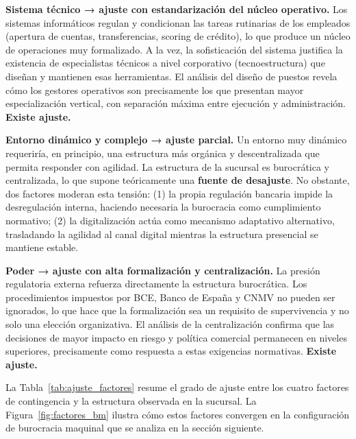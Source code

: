 \textbf{Sistema técnico → ajuste con estandarización del núcleo operativo.} Los sistemas
informáticos regulan y condicionan las tareas rutinarias de los empleados (apertura de
cuentas, transferencias, scoring de crédito), lo que produce un núcleo de operaciones muy
formalizado. A la vez, la sofisticación del sistema justifica la existencia de
especialistas técnicos a nivel corporativo (tecnoestructura) que diseñan y mantienen esas
herramientas. El análisis del diseño de puestos revela cómo los gestores operativos son
precisamente los que presentan mayor especialización vertical, con separación máxima entre
ejecución y administración. \textbf{Existe ajuste.}

\textbf{Entorno dinámico y complejo → ajuste parcial.} Un entorno muy dinámico requeriría,
en principio, una estructura más orgánica y descentralizada que permita responder con
agilidad. La estructura de la sucursal es burocrática y centralizada, lo que supone
teóricamente una \textbf{fuente de desajuste}. No obstante, dos factores moderan esta
tensión: (1) la propia regulación bancaria impide la desregulación interna, haciendo
necesaria la burocracia como cumplimiento normativo; (2) la digitalización actúa como
mecanismo adaptativo alternativo, trasladando la agilidad al canal digital mientras la
estructura presencial se mantiene estable.

\textbf{Poder → ajuste con alta formalización y centralización.} La presión regulatoria
externa refuerza directamente la estructura burocrática. Los procedimientos impuestos por
BCE, Banco de España y CNMV no pueden ser ignorados, lo que hace que la formalización sea
un requisito de supervivencia y no solo una elección organizativa. El análisis de la
centralización confirma que las decisiones de mayor impacto en riesgo y política comercial
permanecen en niveles superiores, precisamente como respuesta a estas exigencias normativas.
\textbf{Existe ajuste.}

La Tabla~\ref{tab:ajuste_factores} resume el grado de ajuste entre los cuatro factores de
contingencia y la estructura observada en la sucursal. La Figura~\ref{fig:factores_bm}
ilustra cómo estos factores convergen en la configuración de burocracia maquinal que se
analiza en la sección siguiente.

